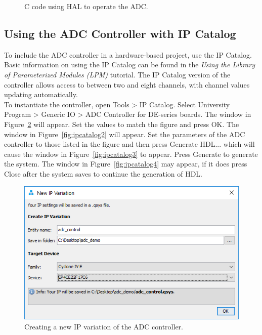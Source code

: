 \documentclass[11pt, twoside, pdftex]{article}
\begin{document}


\begin{figure}

\caption{C code using HAL to operate the ADC.}
\label{fig:hal_code}
\end{figure}

\FloatBarrier
\subsection{Using the ADC Controller with IP Catalog}
To include the ADC controller in a hardware-based project, use the IP Catalog. Basic information on using the IP Catalog can be found in the {\it Using the Library of Parameterized Modules (LPM)} tutorial. The IP Catalog version of the controller allows access to between two and eight channels, with channel values updating automatically. 
\\

To instantiate the controller, open {\sf Tools > IP Catalog}. Select {\sf University Program > Generic IO > ADC Controller for DE-series boards}. The window in Figure~\ref{fig:ipcatalog1} will appear. Set the values to match the figure and press {\sf OK}. The window in Figure~\ref{fig:ipcatalog2} will appear. Set the parameters of the ADC controller to those listed in the figure and then press {\sf Generate HDL...} which will cause the window in Figure~\ref{fig:ipcatalog3} to appear. Press {\sf Generate} to generate the system. The window in Figure~\ref{fig:ipcatalog4} may appear, if it does press {\sf Close} after the system saves to continue the generation of HDL.

\begin {figure} [H]
\begin {center}
\includegraphics [scale = 0.6] {figures/ipcatalog1.png}
\end {center}
\caption {Creating a new IP variation of the ADC controller.}
\label {fig:ipcatalog1}
\end {figure}
\end{document}
